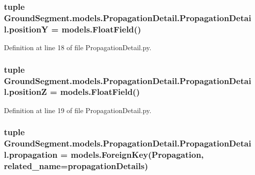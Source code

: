 \subsubsection[{position\+Y}]{\setlength{\rightskip}{0pt plus 5cm}tuple Ground\+Segment.\+models.\+Propagation\+Detail.\+Propagation\+Detail.\+position\+Y = models.\+Float\+Field()\hspace{0.3cm}{\ttfamily [static]}}\label{class_ground_segment_1_1models_1_1_propagation_detail_1_1_propagation_detail_a9950144bf129bba080e6a6e3380a0a9f}


Definition at line 18 of file Propagation\+Detail.\+py.

\hypertarget{class_ground_segment_1_1models_1_1_propagation_detail_1_1_propagation_detail_a92f9fb549c5a8a95cac5e80ec8968ae6}{}
\subsubsection[{position\+Z}]{\setlength{\rightskip}{0pt plus 5cm}tuple Ground\+Segment.\+models.\+Propagation\+Detail.\+Propagation\+Detail.\+position\+Z = models.\+Float\+Field()\hspace{0.3cm}{\ttfamily [static]}}\label{class_ground_segment_1_1models_1_1_propagation_detail_1_1_propagation_detail_a92f9fb549c5a8a95cac5e80ec8968ae6}


Definition at line 19 of file Propagation\+Detail.\+py.

\hypertarget{class_ground_segment_1_1models_1_1_propagation_detail_1_1_propagation_detail_a4c6022e53fef3a255ae7d9453e615b52}{}
\subsubsection[{propagation}]{\setlength{\rightskip}{0pt plus 5cm}tuple Ground\+Segment.\+models.\+Propagation\+Detail.\+Propagation\+Detail.\+propagation = models.\+Foreign\+Key({\bf Propagation}, related\+\_\+name=\textquotesingle{}propagation\+Details\textquotesingle{})\hspace{0.3cm}{\ttfamily [static]}}\label{class_ground_segment_1_1models_1_1_propagation_detail_1_1_propagation_detail_a4c6022e53fef3a255ae7d9453e615b52}


